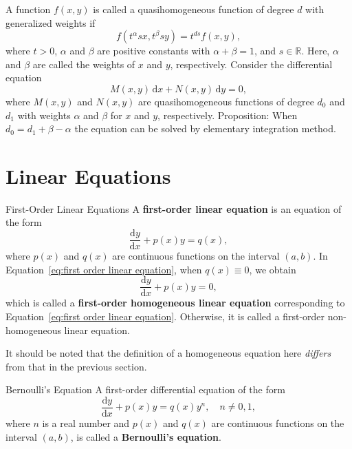\documentclass[11pt]{elegantbook}
\begin{document}
\begin{example}
    A function \(f(x, y)\) is called a quasihomogeneous function of degree \(d\) with generalized weights if
    \[
    f(t^\alpha s x, t^\beta s y) = t^{ds} f(x, y),
    \]
    where \(t > 0\), \(\alpha\) and \(\beta\) are positive constants with \(\alpha + \beta = 1\), and \(s \in \mathbb{R}\). 
    Here, \(\alpha\) and \(\beta\) are called the weights of \(x\) and \(y\), respectively.
    Consider the differential equation
    \[
    M(x, y) \, \mathrm{d}x + N(x, y) \, \mathrm{d}y = 0,
    \]
    where \(M(x, y)\) and \(N(x, y)\) are quasihomogeneous functions of degree \(d_0\) and \(d_1\) 
    with weights \(\alpha\) and \(\beta\) for \(x\) and \(y\), respectively.
    Proposition: When \(d_0 = d_1 + \beta - \alpha\) the equation can be solved by elementary integration method.
\end{example}
\section{Linear Equations}
\begin{definition}{First-Order Linear Equations}
    A \textbf{first-order linear equation} is an equation of the form
    \begin{equation}\label{eq:first order linear equation}
        \frac{\mathrm{d}y}{\mathrm{d}x} + p(x) y = q(x),
    \end{equation}
    where \(p(x)\) and \(q(x)\) are continuous functions on the interval \((a, b)\).
    In Equation~\eqref{eq:first order linear equation}, when \(q(x) \equiv  0\), we obtain
    \begin{equation*}
        \frac{\mathrm{d}y}{\mathrm{d}x} + p(x) y = 0,
    \end{equation*}
    which is called a \textbf{first-order homogeneous linear equation} corresponding to Equation~\eqref{eq:first order linear equation}.
    Otherwise, it is called a first-order non-homogeneous linear equation.
\end{definition}
\begin{note}
    It should be noted that the definition of a homogeneous equation here \emph{differs} from that in the previous section.
\end{note}

\begin{definition}{Bernoulli's Equation}
    A first-order differential equation of the form
    \begin{equation*}
        \frac{\mathrm{d}y}{\mathrm{d}x} + p(x) y = q(x) y^n,\quad n \neq 0, 1,
    \end{equation*}
    where \(n\) is a real number and \(p(x)\) and \(q(x)\) are continuous functions on the interval \((a, b)\), 
    is called a \textbf{Bernoulli's equation}.
    
\end{definition}
\end{document}
